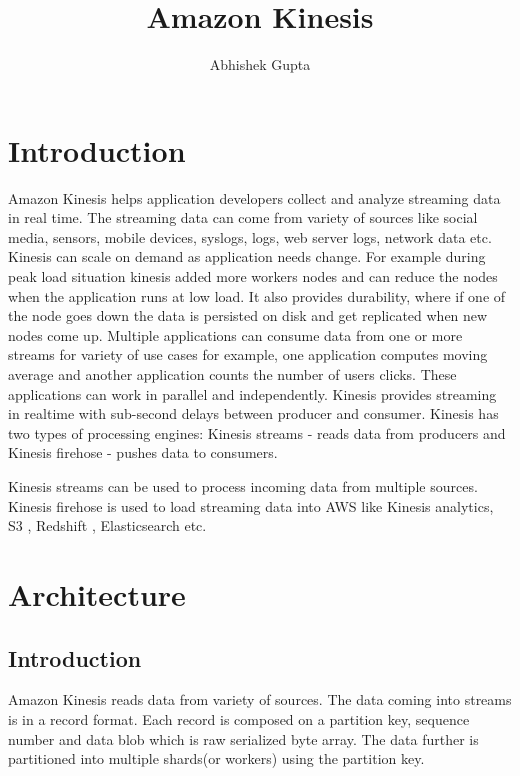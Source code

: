 \documentclass[9pt,twocolumn,twoside]{../../styles/osajnl}
\title{Amazon Kinesis}
\author[1,*]{Abhishek Gupta}
\affil[1]{School of Informatics and Computing, Bloomington, IN 47408, U.S.A.}
\affil[*]{Corresponding authors: abhigupt@iu.edu}
\begin{document}
\maketitle

\section{Introduction}
Amazon Kinesis \cite{www-kinesis} helps application developers collect and
analyze streaming data in real time. The streaming data can come from variety of
sources like social media, sensors, mobile devices, syslogs, logs, web server
logs, network data etc. Kinesis can scale on demand as application needs change.
For example during peak load situation kinesis added more workers nodes and can
reduce the nodes when the application runs at low load. It also provides
durability, where if one of the node goes down the data is persisted on disk and
get replicated when new nodes come up. Multiple applications can consume data
from one or more streams for variety of use cases for example, one application
computes moving average and another application counts the number of users
clicks. These applications can work in parallel and independently. Kinesis
provides streaming in realtime with sub-second delays between producer and
consumer. Kinesis has two types of processing engines:  Kinesis streams - reads data from producers
and Kinesis firehose - pushes data to consumers.

Kinesis streams can be used to process incoming data from multiple sources.
Kinesis firehose is used to load streaming data into AWS like Kinesis analytics,
S3 \cite{www-aws-s3}, Redshift \cite{www-aws-redshift}, Elasticsearch  \cite{www-aws-es} etc.

\section{Architecture} 
\subsection{Introduction}
Amazon Kinesis reads data from variety of sources. The data coming into streams
is in a record format. Each record is composed on a partition key, sequence
number and data blob which is raw serialized byte array. The data further is
partitioned into multiple shards(or workers) using the partition key. 
\end{document}
